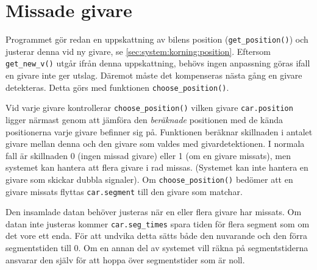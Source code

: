 \section{Missade givare}
\label{sec:missade givare}

Programmet gör redan en uppskattning av bilens position (\texttt{get\_position()})
 och justerar denna vid ny givare, se \ref{sec:system:korning:position}.
Eftersom \texttt{get\_new\_v()} utgår ifrån denna uppskattning, behövs ingen
anpassning göras ifall en givare inte ger utslag. Däremot måste det 
kompenseras nästa gång en givare detekteras. Detta görs med funktionen
\texttt{choose\_position()}.

Vid varje givare kontrollerar \texttt{choose\_position()} vilken givare
\texttt{car.position} ligger närmast genom att jämföra den \emph{beräknade} positionen med de kända positionerna varje givare befinner sig på.
Funktionen beräknar skillnaden i antalet givare mellan denna och den givare som
valdes med givardetektionen. I normala fall är skillnaden 0 (ingen missad givare) eller 1 (om en
givare missats), men systemet kan hantera att flera givare i rad missas.
(Systemet kan inte hantera en givare som skickar dubbla signaler). Om
\texttt{choose\_position()} bedömer att en givare missats flyttas
\texttt{car.segment} till den givare som matchar.

Den insamlade datan behöver justeras när en eller flera givare har missats. Om
datan inte justeras kommer \texttt{car.seg\_times} spara tiden för flera segment
som om det vore ett enda. För att undvika detta sätts både den nuvarande och den
förra segmentstiden till 0. Om en annan del av systemet vill räkna på
segmentstiderna ansvarar den själv för att hoppa över segmentstider som är noll.
